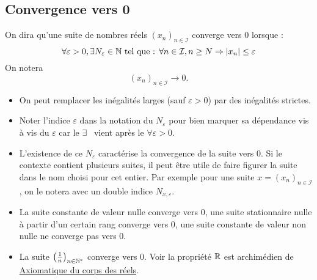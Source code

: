\subsection{Convergence vers 0}
\begin{defi}
 On dira qu'une suite de nombres réels $(x_n)_{n\in \mathcal I}$ converge vers $0$ lorsque :
\begin{displaymath}
 \forall \varepsilon >0 , \exists N_\varepsilon\in \mathbb{N} \text{ tel que : } \forall n\in \mathcal I,  n \geq N \Rightarrow |x_n| \leq \varepsilon
\end{displaymath}
On notera
\begin{displaymath}
 (x_n)_{n\in \mathcal I} \rightarrow 0.
\end{displaymath}
\end{defi}

\begin{rems}
\begin{itemize}
  \item On peut remplacer les inégalités larges (sauf $\varepsilon>0$) par des inégalités strictes.
  \item Noter l'indice $\varepsilon$ dans la notation du $N_\varepsilon$ pour bien marquer sa dépendance vis à vis du $\varepsilon$ car le \og$\exists$\fg~ vient après le \og$\forall \varepsilon >0$\fg.
  \item L'existence de ce $N_{\varepsilon}$ caractérise la convergence de la suite vers $0$. Si le contexte contient plusieurs suites, il peut être utile de faire figurer la suite dans le nom choisi pour cet entier. Par exemple pour une suite $x=(x_n)_{n\in \mathcal I}$, on le notera avec un double indice $N_{x, \varepsilon}$. 
\end{itemize}
\end{rems}

\begin{exples}
 \begin{itemize}
   \item La suite constante de valeur nulle converge vers $0$, une suite stationnaire nulle à partir d'un certain rang converge vers $0$, une suite constante de valeur non nulle ne converge pas vers 0.
   \item La suite $\left(\frac{1}{n}\right)_{n\in\mathbb{N}^*}$ converge vers $0$. Voir la propriété $\mathbb{R}$ est archimédien  de \href{\baseurl C2192.pdf}{Axiomatique du corps des réels}.
\end{itemize}
\end{exples}

